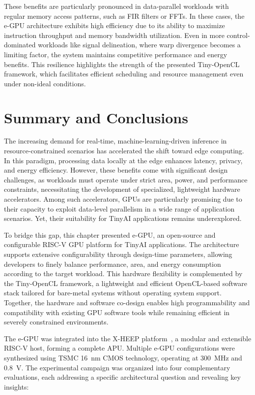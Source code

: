             These benefits are particularly pronounced in data-parallel workloads with regular memory access patterns, such as FIR filters or FFTs. In these cases, the \mbox{e-GPU} architecture exhibits high efficiency due to its ability to maximize instruction throughput and memory bandwidth utilization. Even in more control-dominated workloads like signal delineation, where warp divergence becomes a limiting factor, the system maintains competitive performance and energy benefits. This resilience highlights the strength of the presented \mbox{Tiny-OpenCL} framework, which facilitates efficient scheduling and resource management even under non-ideal conditions.

    \section{Summary and Conclusions}
    \label{sec:conclusions}
    
        The increasing demand for real-time, machine-learning-driven inference in resource-constrained scenarios has accelerated the shift toward edge computing. In this paradigm, processing data locally at the edge enhances latency, privacy, and energy efficiency. However, these benefits come with significant design challenges, as workloads must operate under strict area, power, and performance constraints, necessitating the development of specialized, lightweight hardware accelerators. Among such accelerators, GPUs are particularly promising due to their capacity to exploit data-level parallelism in a wide range of application scenarios. Yet, their suitability for TinyAI applications remains underexplored.
    
        To bridge this gap, this chapter presented \mbox{e-GPU}, an open-source and configurable RISC-V GPU platform for TinyAI applications. The architecture supports extensive configurability through design-time parameters, allowing developers to finely balance performance, area, and energy consumption according to the target workload. This hardware flexibility is complemented by the \mbox{Tiny-OpenCL} framework, a lightweight and efficient OpenCL-based software stack tailored for bare-metal systems without operating system support. Together, the hardware and software co-design enables high programmability and compatibility with existing GPU software tools while remaining efficient in severely constrained environments.

        The \mbox{e-GPU} was integrated into the \mbox{X-HEEP} platform~\cite{x-heep}, a modular and extensible RISC-V host, forming a complete APU. Multiple \mbox{e-GPU} configurations were synthesized using TSMC \SI{16}{\nano\meter} CMOS technology, operating at \SI{300}{\mega\hertz} and \SI{0.8}{\volt}. The experimental campaign was organized into four complementary evaluations, each addressing a specific architectural question and revealing key insights:

